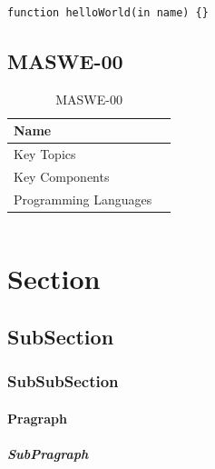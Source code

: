 \begin{lstlisting}[float=tbh, mathescape=true, captionpos=b, caption=foo, label=pseudo_code, language=pseudo]
  function helloWorld(in name) {}
\end{lstlisting}



\subsection{MASWE-00}
\label{subsec:maswe-00}

\begin{table}[H]
    \centering
    \renewcommand{\arraystretch}{1.3}
        \begin{tabular}{p{5cm} p{8cm}} 
        \toprule
        Name &  \\ 
        \midrule
        Key Topics &  \\
        Key Components & \texttt{} \\
        Programming Languages &  \\ 
        \bottomrule
        \end{tabular}
    \caption{MASWE-00}
    \label{tab:maswe-00}
\end{table}

\begin{lstlisting}[style=JavaStyle, float=tbh, captionpos=b, caption={}, label={lst:}]

\end{lstlisting}

\section{Section}
\subsection{SubSection}
\subsubsection{SubSubSection}
\paragraph{Pragraph}
\subparagraph{SubPragraph}

